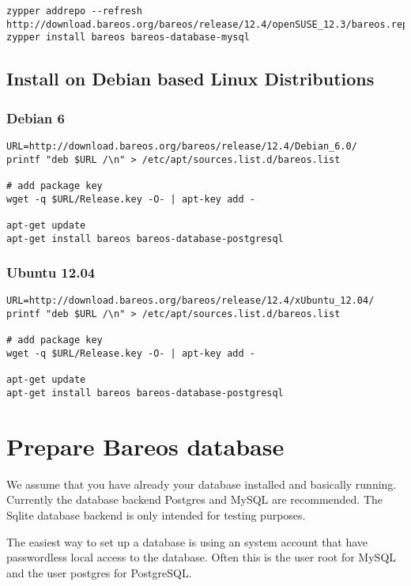 \begin{verbatim}
zypper addrepo --refresh http://download.bareos.org/bareos/release/12.4/openSUSE_12.3/bareos.repo
zypper install bareos bareos-database-mysql
\end{verbatim}


\subsection{Install on Debian based Linux Distributions}


\subsubsection{Debian 6}

\begin{verbatim}
URL=http://download.bareos.org/bareos/release/12.4/Debian_6.0/
printf "deb $URL /\n" > /etc/apt/sources.list.d/bareos.list

# add package key
wget -q $URL/Release.key -O- | apt-key add -

apt-get update
apt-get install bareos bareos-database-postgresql
\end{verbatim}

\subsubsection{Ubuntu 12.04}

\begin{verbatim}
URL=http://download.bareos.org/bareos/release/12.4/xUbuntu_12.04/
printf "deb $URL /\n" > /etc/apt/sources.list.d/bareos.list

# add package key
wget -q $URL/Release.key -O- | apt-key add -

apt-get update
apt-get install bareos bareos-database-postgresql
\end{verbatim}

\section{Prepare Bareos database}
    \label{CreateDatabase}

We assume that you have already your database installed and basically running.
Currently the database backend Postgres and MySQL are recommended. The Sqlite database backend is only intended for testing purposes.

The easiest way to set up a database is using an system account that have passwordless local access to the database. 
Often this is the user root for MySQL and the user postgres for PostgreSQL.

